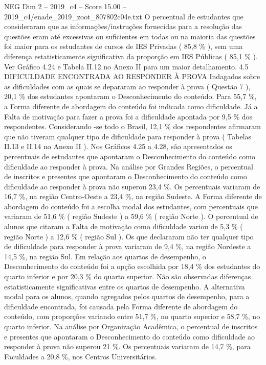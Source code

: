 \begin{textsample}{NEG Dim 2 – 2019\_c4 – Score 15.00 – 2019\_c4/enade\_2019\_zoot\_807802c04e.txt}
O percentual de estudantes que consideraram que as informações/instruções fornecidas para a resolução das questões eram até excessivas ou suficientes em todas ou na maioria das questões foi maior para os estudantes de cursos de IES Privadas ( 85,8 \% ), sem uma diferença estatisticamente significativa da proporção em IES Públicas ( 85,1 \% ).
Ver Gráfico 4.24 e Tabela II.12 no Anexo II para um maior detalhamento. 4.5 DIFICULDADE ENCONTRADA AO RESPONDER À PROVA Indagados sobre as dificuldades com as quais se depararam ao responder à prova ( Questão 7 ), 20,1 \% dos estudantes apontaram o Desconhecimento do conteúdo.
Para 55,7 \%, a Forma diferente de abordagem do conteúdo foi indicada como dificuldade.
Já a Falta de motivação para fazer a prova foi a dificuldade apontada por 9,5 \% dos respondentes.
Considerando -se todo o Brasil, 12,1 \% dos respondentes afirmaram que não tiveram qualquer tipo de dificuldade para responder à prova ( Tabelas II.13 e II.14 no Anexo II ).
Nos Gráficos 4.25 a 4.28, são apresentados os percentuais de estudantes que apontaram o Desconhecimento do conteúdo como dificuldade ao responder à prova.
Na análise por Grandes Regiões, o percentual de inscritos e presentes que apontaram o Desconhecimento do conteúdo como dificuldade ao responder à prova não superou 23,4 \%.
Os percentuais variaram de 16,7 \%, na região Centro-Oeste a 23,4 \%, na região Sudeste.
A Forma diferente de abordagem do conteúdo foi a escolha modal dos estudantes, com percentuais que variaram de 51,6 \% ( região Sudeste ) a 59,6 \% ( região Norte ).
O percentual de alunos que citaram a Falta de motivação como dificuldade variou de 5,3 \% ( região Norte ) a 12,6 \% ( região Sul ).
Os que declararam não ter qualquer tipo de dificuldade para responder à prova variaram de 9,4 \%, na região Nordeste a 14,5 \%, na região Sul.
Em relação aos quartos de desempenho, o Desconhecimento do conteúdo foi a opção escolhida por 18,4 \% dos estudantes do quarto inferior e por 20,3 \% do quarto superior.
Não são observadas diferenças estatisticamente significativas entre os quartos de desempenho.
A alternativa modal para os alunos, quando agregados pelos quartos de desempenho, para a dificuldade encontrada, foi causada pela Forma diferente de abordagem do conteúdo, com proporções variando entre 51,7 \%, no quarto superior e 58,7 \%, no quarto inferior.
Na análise por Organização Acadêmica, o percentual de inscritos e presentes que apontaram o Desconhecimento do conteúdo como dificuldade ao responder à prova não superou 21 \%.
Os percentuais variaram de 14,7 \%, para Faculdades a 20,8 \%, nos Centros Universitários.

\end{textsample}
